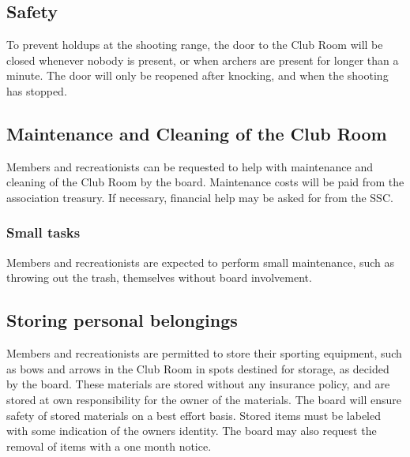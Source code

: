 \documentclass[a4paper]{article}
\begin{document}
\subsection{Safety}
To prevent holdups at the shooting range, the door to the Club Room will be closed whenever nobody is present, or when archers are present for longer than a minute. The door will only be reopened after knocking, and when the shooting has stopped.

\subsection{Maintenance and Cleaning of the Club Room}
Members and recreationists can be requested to help with maintenance and cleaning of the Club Room by the board. Maintenance costs will be paid from the association treasury. If necessary, financial help may be asked for from the SSC.

\subsubsection{Small tasks}
Members and recreationists are expected to perform small maintenance, such as throwing out the trash, themselves without board involvement.

\subsection{Storing personal belongings}
Members and recreationists are permitted to store their sporting equipment, such as bows and arrows in the Club Room in spots destined for storage, as decided by the board. These materials are stored without any insurance policy, and are stored at own responsibility for the owner of the materials. The board will ensure safety of stored materials on a best effort basis. Stored items must be labeled with some indication of the owners identity. The board may also request the removal of items with a one month notice.
\end{document}
